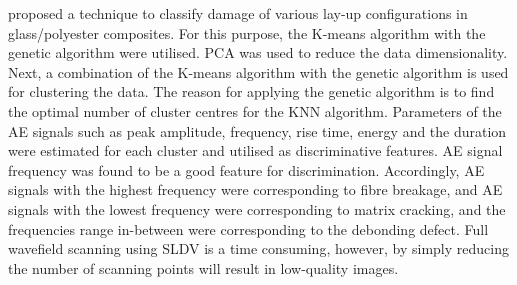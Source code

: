 \textcite{Pashmforoush2014} proposed a technique to classify damage of various lay-up configurations in glass/polyester composites.
For this purpose, the K-means algorithm with the genetic algorithm were utilised. PCA was used to reduce the data dimensionality.
Next, a combination of the K-means algorithm with the genetic algorithm is used for clustering the data. 
The reason for applying the genetic algorithm is to find the optimal number of cluster centres for the KNN algorithm.
Parameters of the AE signals such as peak amplitude, frequency, rise time, energy and the duration were estimated for each cluster and utilised as discriminative features. 
AE signal frequency was found to be a good feature for discrimination. Accordingly, AE signals with the highest frequency were corresponding to fibre breakage, and AE signals with the lowest frequency were corresponding to matrix cracking, and the frequencies range in-between were corresponding to the debonding defect. 
%
Full wavefield scanning using SLDV is a time consuming, however, by simply reducing the number of scanning points will result in low-quality images. 
